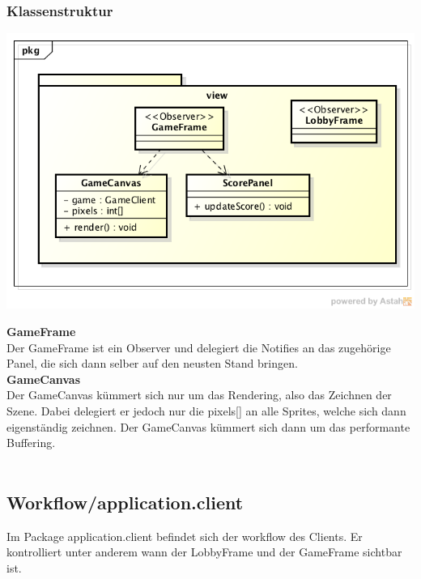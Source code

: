 \documentclass[11pt]{scrartcl}
\begin{document}
\subsubsection{Klassenstruktur}
\includegraphics[scale=0.8]{ClassDiagramView}


\textbf{GameFrame}\\
Der GameFrame ist ein Observer und delegiert die Notifies an das zugehörige Panel, die sich dann selber auf den neusten Stand bringen.\\

\textbf{GameCanvas}\\
Der GameCanvas kümmert sich nur um das Rendering, also das Zeichnen der Szene. Dabei delegiert er jedoch nur die pixels[] an alle Sprites, welche sich dann eigenständig zeichnen. Der GameCanvas kümmert sich dann um das performante Buffering.\\\\


\newpage

\subsection{Workflow/application.client}
Im Package application.client befindet sich der workflow des Clients. Er kontrolliert unter anderem wann der LobbyFrame und der GameFrame sichtbar ist.
\end{document}
